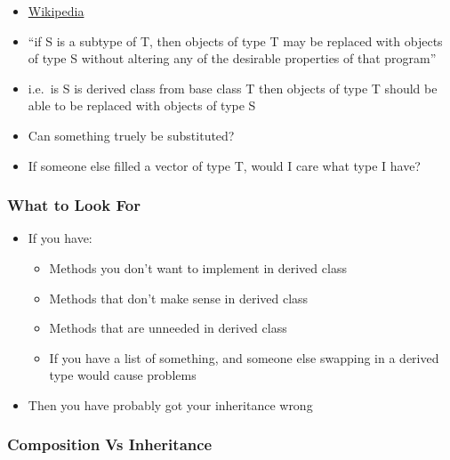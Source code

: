 \begin{itemize}
\itemsep1pt\parskip0pt
\item
  \href{https://en.wikipedia.org/wiki/Liskov_substitution_principle}{Wikipedia}
\item
  ``if S is a subtype of T, then objects of type T may be replaced with
  objects of type S without altering any of the desirable properties of
  that program''
\item
  i.e.~is S is derived class from base class T then objects of type T
  should be able to be replaced with objects of type S
\item
  Can something truely be substituted?
\item
  If someone else filled a vector of type T, would I care what type I
  have?
\end{itemize}

\subsubsection{What to Look For}\label{what-to-look-for}

\begin{itemize}
\itemsep1pt\parskip0pt
\item
  If you have:

  \begin{itemize}
  \itemsep1pt\parskip0pt
  \item
    Methods you don't want to implement in derived class
  \item
    Methods that don't make sense in derived class
  \item
    Methods that are unneeded in derived class
  \item
    If you have a list of something, and someone else swapping in a
    derived type would cause problems
  \end{itemize}
\item
  Then you have probably got your inheritance wrong
\end{itemize}

\subsubsection{Composition Vs
Inheritance}\label{composition-vs-inheritance}

